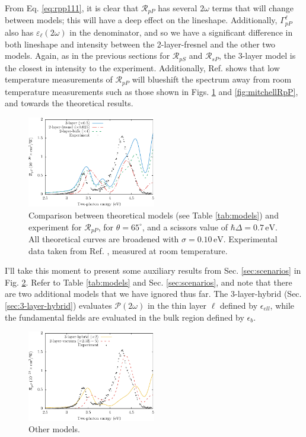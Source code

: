 From Eq. \eqref{eq:rpp111}, it is clear that $\mathcal{R}_{pP}$ has several $2\omega$ terms that will change between models; this will have a deep effect on the lineshape. Additionally, $\Gamma^{\ell}_{pP}$ also has $\varepsilon_{\ell}(2\omega)$ in the denominator, and so we have a significant difference in both lineshape and intensity between the 2-layer-fresnel and the other two models. Again, as in the previous sections for $\mathcal{R}_{pS}$ and $\mathcal{R}_{sP}$, the 3-layer model is the closest in intensity to the experiment. Additionally, Ref. \cite{dadapPRB97} shows that low temperature measurements of $\mathcal{R}_{pP}$ will blueshift the spectrum away from room temperature measurements such as those shown in Figs. \ref{fig:RpP} and \ref{fig:mitchellRpP}, and towards the theoretical results.

\begin{figure}[H]
\centering 
\includegraphics[width=0.5\textwidth]{content/figures/fig-Si1x1-Mejia_RpP}
\caption{Comparison between theoretical models (see Table \ref{tab:models}) and experiment for $\mathcal{R}_{pP}$, for $\theta=65^{\circ}$, and a scissors value of $\hbar\Delta = 0.7\,\text{eV}$. All theoretical curves are broadened with $\sigma=0.10\,\text{eV}$. Experimental data taken from Ref. \cite{mejiaPRB02}, measured at room temperature.}
\label{fig:RpP}
\end{figure}

I'll take this moment to present some auxiliary results from Sec. \ref{sec:scenarios} in Fig. \ref{fig:othermodels}. Refer to Table \ref{tab:models} and Sec. \ref{sec:scenarios}, and note that there are two additional models that we have ignored thus far. The 3-layer-hybrid (Sec. \ref{sec:3-layer-hybrid}) evaluates $\mathcal{P}(2\omega)$ in the thin layer $\ell$ defined by $\epsilon_{ell}$, while the fundamental fields are evaluated in the bulk region defined by $\epsilon_{b}$.

\begin{figure}[H]
\centering 
\includegraphics[width=0.5\textwidth]{content/figures/fig-Si1x1-Mejia_RpP_models}
\caption{Other models. \label{fig:othermodels}}
\end{figure}


